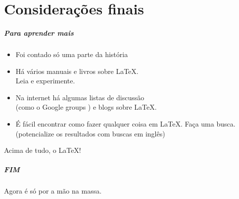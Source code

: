 
\part{Considerações finais}

\begin{frame}
  \frametitle{Para aprender mais}

  \begin{itemize}
  \item Foi contado só uma parte da história
  \item Há vários manuais e livros sobre \LaTeX.\\
    Leia e experimente.
  \item Na internet há algumas listas de discussão\\
    (como o Google groups ) e blogs sobre \LaTeX.
  \item É fácil encontrar como fazer qualquer coisa em
    \LaTeX.  Faça uma busca.\\ (potencialize os resultados com buscas em inglês)
  \end{itemize}
	
\begin{dica}
Acima de tudo,  o \LaTeX!
\end{dica}

\end{frame}


\begin{frame}
  \frametitle{FIM}

  \centering


  \bigskip\bigskip

  \centering
  Agora é só por a mão na massa.\par
\end{frame}


